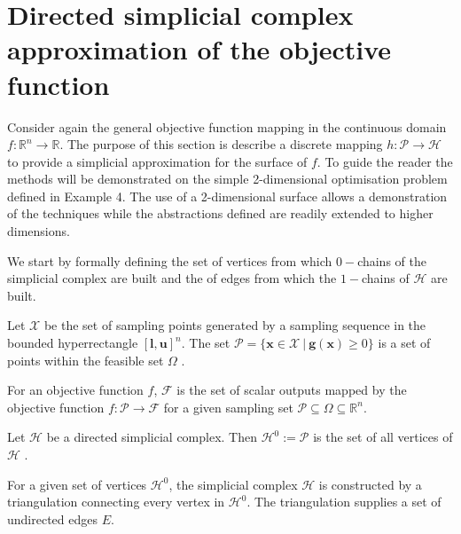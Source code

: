 \section{Directed simplicial complex approximation of the objective function}
Consider again the general objective function mapping in the continuous domain $f : \mathbb{R}^n \rightarrow \mathbb{R}$. The purpose of this section is describe a discrete mapping $h: \mathcal{P}\rightarrow \mathcal{H}$ to provide a simplicial approximation for the surface of $f$. To guide the reader the methods will be demonstrated on the simple 2-dimensional optimisation problem defined in Example 4. The use of a 2-dimensional surface allows a demonstration of the techniques while the abstractions defined are readily extended to higher dimensions. 

We start by formally defining the set of vertices from which $0-$chains of the simplicial complex are built and the of edges from which the $1-$chains of $\mathcal{H}$ are built.

\begin{definition} \label{def:h0}
Let  $\mathcal{X}$ be the set of sampling points generated by a sampling sequence in the bounded hyperrectangle $[\mathbf{l}, \mathbf{u}]^n$. The set $\mathcal{P} = \{\mathbf{x} \in \mathcal{X}~|~\mathbf{g}(\mathbf{x}) \geq 0 \}$ is a set of points within the feasible set $\Omega$ .
\end{definition}

\begin{definition} \label{def:h0.5}
For an objective function $f$, $\mathcal{F}$ is the set of scalar outputs mapped by the objective function $f:\mathcal{P} \rightarrow \mathcal{F}$ for a given sampling set $\mathcal{P} \subseteq \Omega \subseteq \mathbb{R}^n$.
\end{definition}

\begin{definition} \label{def:h1}
Let $\mathcal{H}$ be a directed simplicial complex. Then $\mathcal{H}^0 := \mathcal{P}$ is the set of all vertices of $\mathcal{H}$ .
\end{definition}

\begin{definition} \label{def:h2}
For a given set of vertices $\mathcal{H}^0$, the simplicial complex $\mathcal{H}$ is constructed by a triangulation connecting every vertex in $\mathcal{H}^0$. The triangulation supplies a set of undirected edges $E$.
\end{definition}

